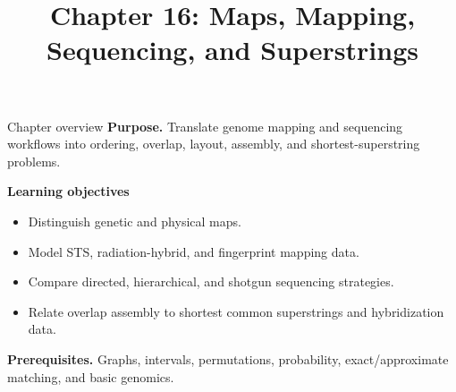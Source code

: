 \documentclass[11pt,letterpaper]{article}
\title{Chapter 16: Maps, Mapping, Sequencing, and Superstrings}
\author{}
\date{}
\begin{document}
\maketitle

\begin{CornellOverviewBox}{Chapter overview}
\textbf{Purpose.} Translate genome mapping and sequencing workflows into ordering, overlap, layout, assembly, and shortest-superstring problems.

\textbf{Learning objectives}
\begin{itemize}
  \item Distinguish genetic and physical maps.
  \item Model STS, radiation-hybrid, and fingerprint mapping data.
  \item Compare directed, hierarchical, and shotgun sequencing strategies.
  \item Relate overlap assembly to shortest common superstrings and hybridization data.
\end{itemize}

\textbf{Prerequisites.} Graphs, intervals, permutations, probability, exact/approximate matching, and basic genomics.
\end{CornellOverviewBox}
\end{document}
